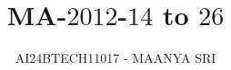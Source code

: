\documentclass[journal]{IEEEtran}
\begin{document}

\vspace{3cm}

\title{MA-$2012$-$14$ to $26$}
\author{AI24BTECH11017 - MAANYA SRI
}
{\let\newpage\relax\maketitle}

\renewcommand{\thefigure}{\theenumi}
\renewcommand{\thetable}{\theenumi}
\setlength{\intextsep}{10pt} %


\renewcommand{\thetable}{\theenumi}
\end{document}
